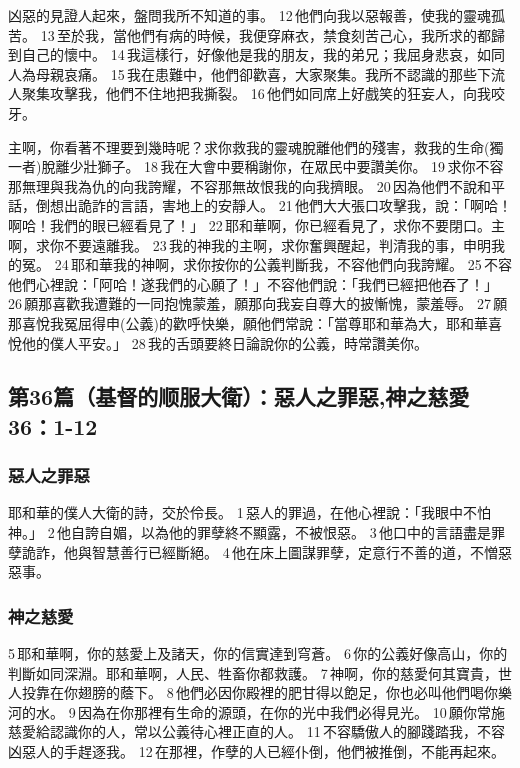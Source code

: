 凶惡的見證人起來，盤問我所不知道的事。
12 他們向我以惡報善，使我的靈魂孤苦。
13 至於我，當他們有病的時候，我便穿麻衣，禁食刻苦己心，我所求的都歸到自己的懷中。
14 我這樣行，好像他是我的朋友，我的弟兄；我屈身悲哀，如同人為母親哀痛。
15 我在患難中，他們卻歡喜，大家聚集。我所不認識的那些下流人聚集攻擊我，他們不住地把我撕裂。
16 他們如同席上好戲笑的狂妄人，向我咬牙。


主啊，你看著不理要到幾時呢？求你救我的靈魂脫離他們的殘害，救我的生命(獨一者)脫離少壯獅子。
18 我在大會中要稱謝你，在眾民中要讚美你。
19 求你不容那無理與我為仇的向我誇耀，不容那無故恨我的向我擠眼。
20 因為他們不說和平話，倒想出詭詐的言語，害地上的安靜人。
21 他們大大張口攻擊我，說：「啊哈！啊哈！我們的眼已經看見了！」
22 耶和華啊，你已經看見了，求你不要閉口。主啊，求你不要遠離我。
23 我的神我的主啊，求你奮興醒起，判清我的事，申明我的冤。
24 耶和華我的神啊，求你按你的公義判斷我，不容他們向我誇耀。
25 不容他們心裡說：「阿哈！遂我們的心願了！」不容他們說：「我們已經把他吞了！」
26 願那喜歡我遭難的一同抱愧蒙羞，願那向我妄自尊大的披慚愧，蒙羞辱。
27 願那喜悅我冤屈得申(公義)的歡呼快樂，願他們常說：「當尊耶和華為大，耶和華喜悅他的僕人平安。」
28 我的舌頭要終日論說你的公義，時常讚美你。

\subsection{第36篇（基督的顺服大衛）：惡人之罪惡,神之慈愛 36：1-12}
\subsubsection{惡人之罪惡}

耶和華的僕人大衛的詩，交於伶長。
1 惡人的罪過，在他心裡說：「我眼中不怕神。」
2 他自誇自媚，以為他的罪孽終不顯露，不被恨惡。
3 他口中的言語盡是罪孽詭詐，他與智慧善行已經斷絕。
4 他在床上圖謀罪孽，定意行不善的道，不憎惡惡事。

\subsubsection{神之慈愛}
5 耶和華啊，你的慈愛上及諸天，你的信實達到穹蒼。
6 你的公義好像高山，你的判斷如同深淵。耶和華啊，人民、牲畜你都救護。
7 神啊，你的慈愛何其寶貴，世人投靠在你翅膀的蔭下。
8 他們必因你殿裡的肥甘得以飽足，你也必叫他們喝你樂河的水。
9 因為在你那裡有生命的源頭，在你的光中我們必得見光。
10 願你常施慈愛給認識你的人，常以公義待心裡正直的人。
11 不容驕傲人的腳踐踏我，不容凶惡人的手趕逐我。
12 在那裡，作孽的人已經仆倒，他們被推倒，不能再起來。


